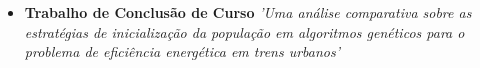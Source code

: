 \documentclass[11pt,a4paper,sans]{moderncv}        %
\begin{document}
\begin{itemize}

\item{\textbf{Trabalho de Conclusão de Curso} \textit{'Uma análise comparativa sobre as estratégias de inicialização da população em algoritmos genéticos para o problema de eficiência energética em trens urbanos'}}

\vspace{3pt}











\end{itemize}
\end{document}
